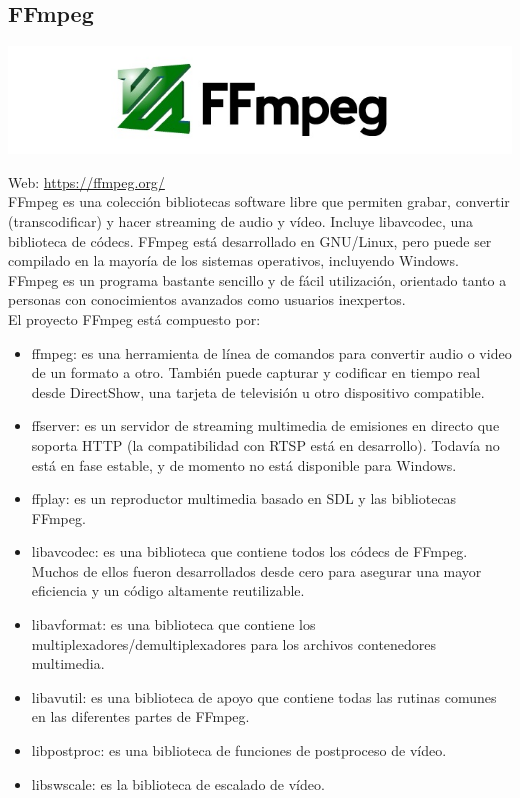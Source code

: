 \subsection{ FFmpeg }


\begin{center}
\includegraphics[scale=0.75]{imagenes/Ffmpeg-logo.jpg}
\end{center}

Web: \url{https://ffmpeg.org/}\\

FFmpeg es una colección bibliotecas software libre que permiten grabar, convertir (transcodificar) y hacer streaming de audio y vídeo. Incluye libavcodec, una biblioteca de códecs. FFmpeg está desarrollado en GNU/Linux, pero puede ser compilado
en la mayoría de los sistemas operativos, incluyendo Windows.\\

FFmpeg es un programa bastante sencillo y de fácil utilización, orientado tanto a personas con conocimientos avanzados como usuarios inexpertos. \\

El proyecto FFmpeg está compuesto por:\\

\begin{itemize}
 \item ffmpeg: es una herramienta de línea de comandos para convertir audio o video de un formato a otro. También puede capturar y codificar en tiempo real desde DirectShow, una tarjeta de televisión u otro dispositivo compatible.
 \item ffserver: es un servidor de streaming multimedia de emisiones en directo que soporta HTTP (la compatibilidad con RTSP está en desarrollo). Todavía no está en fase estable, y de momento no está disponible para Windows.
 \item ffplay: es un reproductor multimedia basado en SDL y las bibliotecas FFmpeg.
 \item libavcodec: es una biblioteca que contiene todos los códecs de FFmpeg. Muchos de ellos fueron desarrollados desde cero para asegurar una mayor eficiencia y un código altamente reutilizable.
 \item libavformat: es una biblioteca que contiene los multiplexadores/demultiplexadores para los archivos contenedores multimedia.
 \item libavutil: es una biblioteca de apoyo que contiene todas las rutinas comunes en las diferentes partes de FFmpeg.
 \item libpostproc: es una biblioteca de funciones de postproceso de vídeo.
 \item libswscale: es la biblioteca de escalado de vídeo.
\end{itemize}

